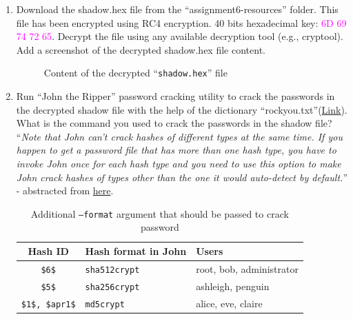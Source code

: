 \documentclass[11pt,letterpaper]{article}
\begin{document}
	\begin{enumerate}
		\item Download the shadow.hex file from the ``assignment6-resources'' folder. This file has been encrypted using RC4 encryption. 40 bits hexadecimal key: \textcolor{magenta}{6D 69 74 72 65}. Decrypt the file using any available decryption tool (e.g., cryptool). Add a screenshot of the decrypted shadow.hex file content.
		
		\begin{figure}[h]
			\centering
		\caption{Content of the decrypted ``{\tt shadow.hex}'' file}
		\end{figure}
		
		
		
		\item Run ``John the Ripper'' password cracking utility to crack the passwords in the decrypted shadow file with the help of the dictionary ``rockyou.txt''(\href{https://uniofmora-my.sharepoint.com/:t:/g/personal/scharles_uom_lk/EQvMHge3CrZNpeE7WGXpapoBslFMMcgHih0teepNIwDVIg?e=9aEjJd}{Link}). What is the command you used to crack the passwords in the shadow file?\\		
		
		``\textit{Note that John can't crack hashes of different
			types at the same time.  If you happen to get a password file that has more than one hash type, you have to invoke John once for each hash type and you need to use this option to make John crack hashes of types other than the one it would auto-detect by default.}'' - abstracted from \href{https://github.com/openwall/john/blob/bleeding-jumbo/doc/OPTIONS}{here}.\\
		
		\begin{table}[!h]
			\centering
			\begin{tabular}{|c | l | l |}
				\hline
		\textbf{Hash ID} & \textbf{Hash format in John} & \textbf{Users}\\\hline
		{\tt \$6\$} & {\tt sha512crypt} & root, bob, administrator\\
		{\tt \$5\$} & {\tt sha256crypt} & ashleigh, penguin\\
		{\tt \$1\$, \$apr1\$} & {\tt md5crypt} & alice, eve, claire\\
		\hline\hline		
			\end{tabular}
		\caption{Additional {\tt --format} argument that should be passed to crack password}
		\end{table}
		

\end{enumerate}
\end{document}
